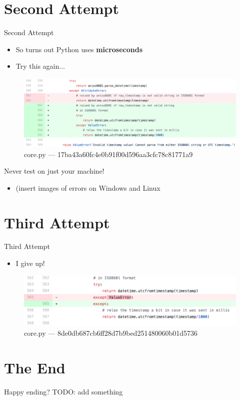 \documentclass[10pt]{beamer}
\begin{document}
\section{Second Attempt}
\begin{frame}{Second Attempt}
	\begin{itemize}
		\item So turns out Python uses \textbf{microseconds}
		\item Try this again...
	\end{itemize}
	\begin{figure}
		\centering
		\includegraphics[width=\textwidth]{images/commit2.png}
		\caption{core.py --- 17ba43a60fc4e0b91f00d596aa3cfc78c81771a9}
	\end{figure}
\end{frame}

\begin{frame}{Never test on just your machine!}
	\begin{itemize}
		\item (insert images of errors on Windows and Linux
	\end{itemize}
\end{frame}

\section{Third Attempt}
\begin{frame}{Third Attempt}
	\begin{itemize}
		\item I give up!
	\end{itemize}
	\begin{figure}
		\centering
		\includegraphics[width=\textwidth]{images/commit3.png}
		\caption{core.py --- 8de0db687cb6ff28d7b9bed251480060b01d5736}
	\end{figure}
\end{frame}

\section{The End}
\begin{frame}{Happy ending?}
	TODO: add something
\end{frame}
\end{document}
